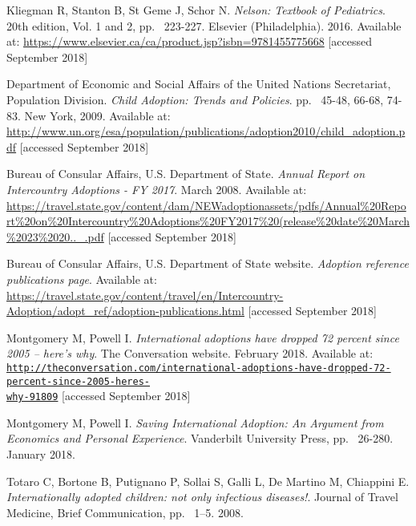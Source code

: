 
\begin{thebibliography}{50}

  Kliegman R, Stanton B, St Geme J, Schor N.
  \textit{Nelson: Textbook of Pediatrics}.
  20th edition, Vol. 1 and 2,
  pp. ~223-227.
  Elsevier (Philadelphia).
  2016.
  Available at: \url{https://www.elsevier.ca/ca/product.jsp?isbn=9781455775668} [accessed September 2018]
  
  Department of Economic and Social Affairs of the United Nations Secretariat, Population Division.
  \textit{Child Adoption: Trends and Policies}.
  pp. ~45-48, 66-68, 74-83.
  New York,
  2009.
  Available at: \url{http://www.un.org/esa/population/publications/adoption2010/child_adoption.pdf} [accessed September 2018]

  Bureau of Consular Affairs, U.S. Department of State.
  \textit{Annual Report on Intercountry Adoptions - FY 2017}.
  March 2008.
  Available at: \url{https://travel.state.gov/content/dam/NEWadoptionassets/pdfs/Annual%20Report%20on%20Intercountry%20Adoptions%20FY2017%20(release%20date%20March%2023%2020.._.pdf} [accessed September 2018]
  
  Bureau of Consular Affairs, U.S. Department of State website.
  \textit{Adoption reference publications page}.
  Available at: \url{https://travel.state.gov/content/travel/en/Intercountry-Adoption/adopt_ref/adoption-publications.html} [accessed September 2018]

  Montgomery M, Powell I.
  \textit{International adoptions have dropped 72 percent since 2005 – here’s why}.
  The Conversation website.
  February 2018.
  Available at: \href{http://theconversation.com/international-adoptions-have-dropped-72-percent-since-2005-heres-why-91809}{\nolinkurl{http://theconversation.com/international-adoptions-have-dropped-72-percent-since-2005-heres-}
  \\
  \nolinkurl{why-91809}} [accessed September 2018]
  
  Montgomery M, Powell I.
  \textit{Saving International Adoption: An Argument from Economics and Personal Experience}.
  Vanderbilt University Press,
  pp. ~26-280.
  January 2018.
  
  Totaro C, Bortone B, Putignano P, Sollai S, Galli L, De Martino M, Chiappini E.
  \textit{Internationally adopted children: not only infectious diseases!}.
  Journal of Travel Medicine,
  Brief Communication,
  pp. ~1–5.
  2008.
  

\end{thebibliography}
